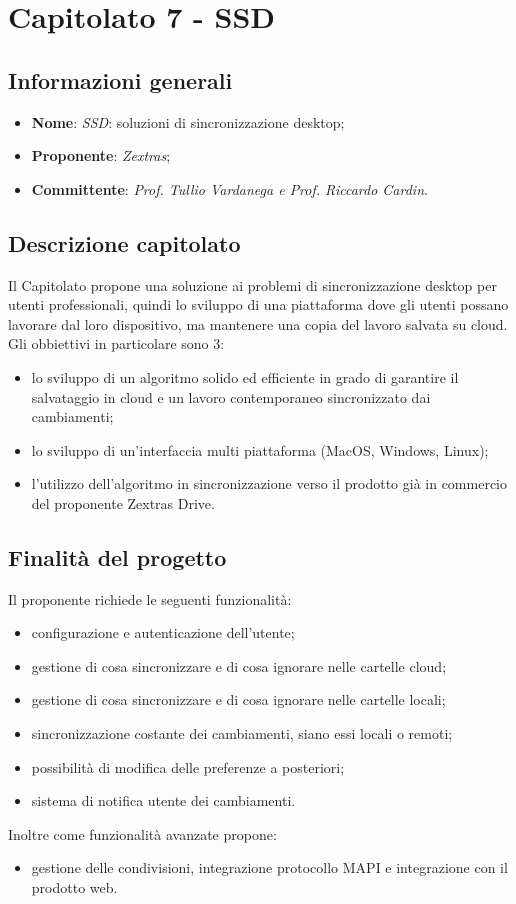 \section{Capitolato 7 - SSD}
\subsection{Informazioni generali}
\begin{itemize}
    \item \textbf{Nome}: \emph{SSD}: soluzioni di sincronizzazione desktop;
    \item \textbf{Proponente}: \emph{Zextras};
    \item \textbf{Committente}: \emph{Prof. Tullio Vardanega e Prof. Riccardo Cardin}.
\end{itemize}
\subsection{Descrizione capitolato}
Il Capitolato propone una soluzione ai problemi di sincronizzazione desktop per utenti professionali, quindi lo sviluppo di una piattaforma dove gli utenti possano lavorare dal loro dispositivo, ma mantenere una copia del lavoro salvata su cloud.
Gli obbiettivi in particolare sono 3:
\begin{itemize}
    \item lo sviluppo di un algoritmo solido ed efficiente in grado di garantire il salvataggio in cloud e un lavoro contemporaneo sincronizzato dai cambiamenti;
    \item lo sviluppo di un'interfaccia multi piattaforma (MacOS, Windows, Linux);
    \item l'utilizzo dell'algoritmo in sincronizzazione verso il prodotto già in commercio del proponente Zextras Drive.
\end{itemize}
\subsection{Finalità del progetto}
Il proponente richiede le seguenti funzionalità:
\begin{itemize}
    \item configurazione e autenticazione dell'utente;
    \item gestione di cosa sincronizzare e di cosa ignorare nelle cartelle cloud;
    \item gestione di cosa sincronizzare e di cosa ignorare nelle cartelle locali;
    \item sincronizzazione costante dei cambiamenti, siano essi locali o remoti;
    \item possibilità di modifica delle preferenze a posteriori;
    \item sistema di notifica utente dei cambiamenti.
\end{itemize}
Inoltre come funzionalità avanzate propone:
\begin{itemize}
    \item gestione delle condivisioni, integrazione protocollo MAPI e integrazione con il prodotto web.
\end{itemize}
